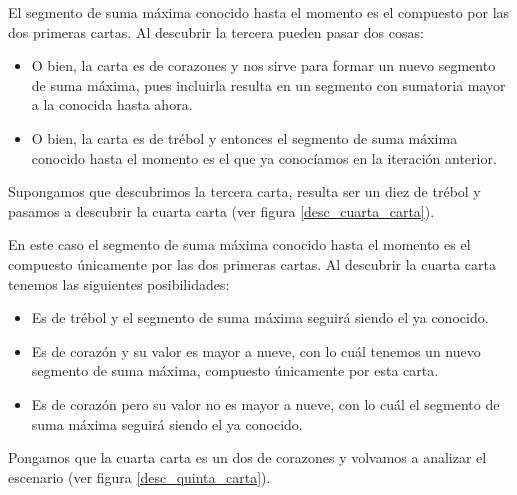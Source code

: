 \documentclass[12pt, a4paper, openany, fleqn]{book}
\newif\ifUsePstPoker
\begin{document}
    El segmento de suma máxima conocido hasta el momento es el compuesto por las dos primeras cartas. Al descubrir la tercera pueden pasar dos cosas:
    \begin{itemize}
        \item O bien, la carta es de corazones y nos sirve para formar un nuevo segmento de suma máxima, pues incluirla resulta en un segmento con sumatoria mayor a la conocida hasta ahora.
        \item O bien, la carta es de trébol y entonces el segmento de suma máxima conocido hasta el momento es el que ya conocíamos en la iteración anterior.
    \end{itemize}

    Supongamos que descubrimos la tercera carta, resulta ser un diez de trébol y pasamos a descubrir la cuarta carta (ver figura \ref{desc_cuarta_carta}).

    \ifUsePstPoker
        \begin{figure}[h]
            \centering
            \psset{framebg=beige}\crdsevh
            \psset{framebg=beige}\crdtwoh
            \psset{framebg=beige}\crdtenc
            \psset{backcolor=red}\crdback
            \psset{backcolor=red}\crdback
            \rput(-4.8,-1){\textbf{\^}} %

            \caption{Descubriendo la cuarta carta} \label{desc_cuarta_carta}
        \end{figure}
    \fi

    \noindent En este caso el segmento de suma máxima conocido hasta el momento es el compuesto únicamente por las dos primeras cartas. Al descubrir la cuarta carta tenemos las siguientes posibilidades:
    \begin{itemize}
        \item Es de trébol y el segmento de suma máxima seguirá siendo el ya conocido.
        \item Es de corazón y su valor es mayor a nueve, con lo cuál tenemos un nuevo segmento de suma máxima, compuesto únicamente por esta carta.
        \item Es de corazón pero su valor no es mayor a nueve, con lo cuál el segmento de suma máxima seguirá siendo el ya conocido.
    \end{itemize}

    Pongamos que la cuarta carta es un dos de corazones y volvamos a analizar el escenario (ver figura \ref{desc_quinta_carta}).

    \ifUsePstPoker
        \begin{figure}[h]
            \centering
            \psset{framebg=beige}\crdsevh
            \psset{framebg=beige}\crdtwoh
            \psset{framebg=beige}\crdtenc
            \psset{framebg=beige}\crdtwoh
            \psset{backcolor=red}\crdback
            \rput(-1.8,-1){\textbf{\^}} %

            \caption{Descubriendo la quinta carta} \label{desc_quinta_carta}
        \end{figure}
    \fi
\end{document}
